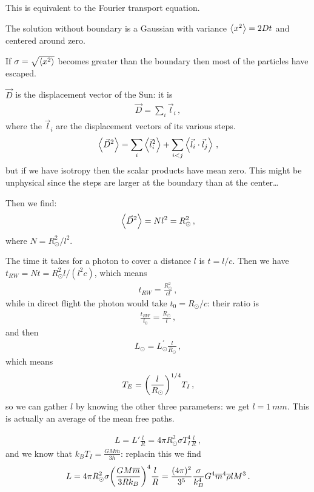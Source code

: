 \documentclass[main.tex]{subfiles}
\begin{document}
This is equivalent to the Fourier transport equation. 

The solution without boundary is a Gaussian with variance \(\expval{x^2} =  2 D t\) and centered around zero. 

If \(\sigma = \sqrt{\expval{x^2}}\) becomes greater than the boundary then most of the particles have escaped. 

\(\vec{D}\) is the displacement vector of the Sun: it is 
%
\begin{align}
  \vec{D} = \sum _{i} \vec{l}_{i}
\,,
\end{align}
%
where the \(\vec{l}_i\) are the displacement vectors of its various steps. 
%
\begin{align}
  \expval{\vec{D}^2} = \sum _{i} \expval{\vec{l}_{i}^2} 
  + \sum _{i<j} \expval{\vec{l}_i \cdot \vec{l}_j}
\,,
\end{align}
%
but if we have isotropy then the scalar products have mean zero. This might be unphysical since the steps are larger at the boundary than at the center\dots

Then we find: 
%
\begin{align}
  \expval{\vec{D}^2} = N l^2 = R _{\odot}^2
\,,
\end{align}
%
where \(N = R _{\odot}^2 / l^2\). 

The time it takes for a photon to cover a distance \(l\) is \(t= l/c\). 
Then we have \(t_{RW} = Nt = R^2 _{\odot} l / (l^2 c)\), which means 
%
\begin{align}
  t_{RW} = \frac{R _{\odot}^2}{cl}
\,,
\end{align}
%
while in direct flight the photon would take \(t_0 = R _{\odot}/ c\): their ratio is 
%
\begin{align}
  \frac{t_{RW}}{t_0 } = \frac{R _{\odot}}{l}
\,,
\end{align}
%
and then 
%
\begin{align}
  L _{\odot} = L _{\odot}^{\prime } \frac{l}{R _{\odot}}
\,,
\end{align}
%
which means 
%
\begin{align}
  T_E = \qty(\frac{l}{R _{\odot}})^{1/4} T_I
\,,
\end{align}
%
so we can gather \(l\) by knowing the other three parameters: we get \(l = \SI{1}{mm}\). This is actually an average of the mean free paths. 

\begin{align}
  L = L' \frac{l}{R} = 4 \pi R _{\odot}^2 \sigma T_I^{4} \frac{l}{R}
\,,
\end{align}
%
and we know that \(k_B T_I = \frac{GM \overline{m}}{3 \hbar}\): replacin this we find 
%
\begin{align}
  L = 4 \pi R^2 _{\odot}\sigma  \qty(\frac{GM \overline{m}}{3 R k_B})^{4} \frac{l}{R}
  = \frac{(4 \pi )^2}{3^{5}} \frac{\sigma }{k_B^4} G^{4} \overline{m}^{4} \overline{\rho} l M^3  
\,.
\end{align}
\end{document}
